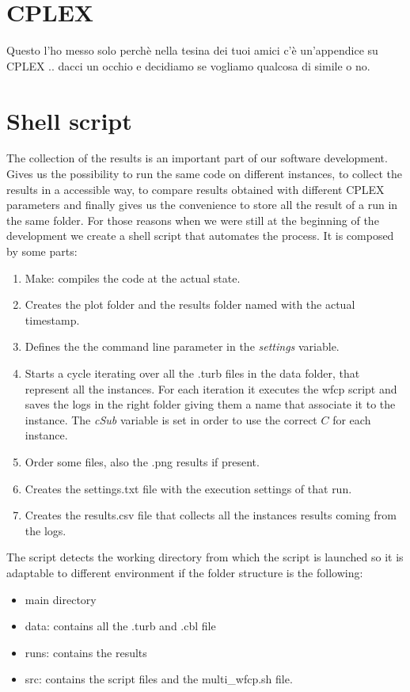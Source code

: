 
\begin{appendices}
\chapter{CPLEX}
Questo l'ho messo solo perchè nella tesina dei tuoi amici c'è un'appendice su CPLEX .. dacci un occhio e decidiamo se vogliamo qualcosa di simile o no.

\chapter{Shell script}
The collection of the results is an important part of our software development. Gives us the possibility to run the same code on different instances, to collect the results in a accessible way, to compare results obtained with different CPLEX parameters and finally gives us the convenience to store all the result of a run in the same folder. 
For those reasons when we were still at the beginning of the development we create a shell script that automates the process. It is composed by some parts:
\begin{enumerate}
\item Make: compiles the code at the actual state.
\item Creates the plot folder and the results folder named with the actual timestamp.
\item Defines the the command line parameter in the \textit{settings} variable.
\item Starts a cycle iterating over all the .turb files in the data folder, that represent all the instances. For each iteration it executes the wfcp script and saves the logs in the right folder giving them a name that associate it to the instance. The \textit{cSub} variable is set in order to use the correct $C$ for each instance.
\item Order some files, also the .png results if present.
\item Creates the settings.txt file with the execution settings of that run.
\item Creates the results.csv file that collects all the instances results coming from the logs.
\end{enumerate}

The script detects the working directory from which the script is launched so it is adaptable to different environment if the folder structure is the following:
\begin{itemize}
\item main directory
\item data: contains all the .turb and .cbl file
\item runs: contains the results 
\item src: contains the script files and the multi\_wfcp.sh file. 
\end{itemize}


\end{appendices}
